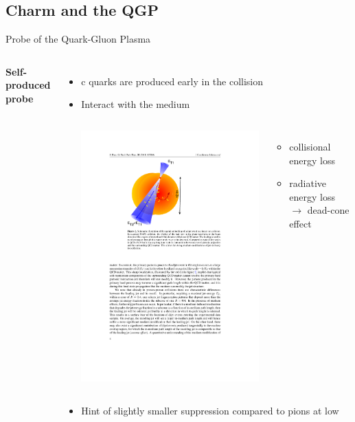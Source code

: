 \documentclass[xcolor={usenames,dvipsnames}]{beamer}
\begin{document}
\subsection{Charm and the QGP}
\begin{frame}{Probe of the Quark-Gluon Plasma}
\begin{columns}
\textbf{\alert{Self-produced probe}}
\begin{itemize}
\item c quarks are \alert{produced early} in the collision
\item Interact with the medium
\begin{columns}
\includegraphics[width=\textwidth]{img/jetquenching}
\begin{itemize}
\item collisional energy loss
\item radiative energy loss $\rightarrow$ \alert{dead-cone effect}
\end{itemize}
\end{columns}
\item Hint of slightly \alert{smaller suppression} compared to pions at low \pt
\end{itemize}


\end{columns}
\end{frame}
\end{document}

